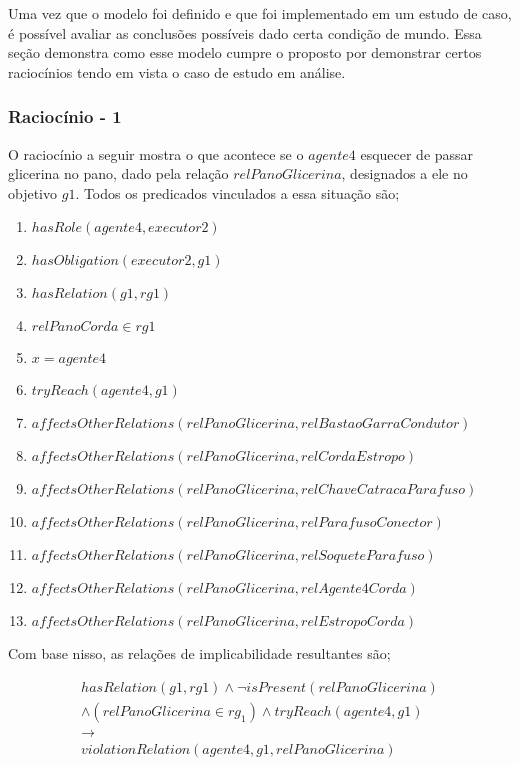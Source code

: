 \label{racs}

Uma vez que o modelo foi definido e que foi implementado em um estudo de caso, é possível avaliar as conclusões possíveis dado certa condição de mundo. Essa seção demonstra 
como esse modelo cumpre o proposto por demonstrar certos raciocínios tendo em vista o caso de estudo em análise. 

\subsubsection{Raciocínio - 1} 
\label{raciocinio1}

O raciocínio a seguir mostra o que acontece se o $agente4$ esquecer de passar glicerina no pano, dado pela relação $relPanoGlicerina$, designados a ele no objetivo $g1$. 
Todos os predicados vinculados a essa situação são;

\begin{enumerate}
	\item $hasRole(agente4,executor2)$ 
	\item $hasObligation(executor2,g1)$
	\item $hasRelation(g1,rg1)$ 
	\item $relPanoCorda \in rg1$
	\item $ x = agente4 $
	\item $tryReach(agente4,g1)$
	\item $affectsOtherRelations(relPanoGlicerina,relBastaoGarraCondutor)$
	\item $affectsOtherRelations(relPanoGlicerina,relCordaEstropo)$  
	\item $affectsOtherRelations(relPanoGlicerina,relChaveCatracaParafuso)$
	\item $affectsOtherRelations(relPanoGlicerina,relParafusoConector)$ 
	\item $affectsOtherRelations(relPanoGlicerina,relSoqueteParafuso)$ 
	\item $affectsOtherRelations(relPanoGlicerina,relAgente4Corda)$ 
	\item $affectsOtherRelations(relPanoGlicerina,relEstropoCorda)$	
\end{enumerate}

Com base nisso, as relações de implicabilidade resultantes são;

\begin{eqnarray}\nonumber
	hasRelation(g1,rg1)\wedge \neg isPresent(relPanoGlicerina)  \nonumber \\ 
	\wedge (relPanoGlicerina\in rg_1) \wedge tryReach(agente4,g1) \nonumber \\ 
	\to \nonumber \\ 
	violationRelation(agente4,g1,relPanoGlicerina) \nonumber \\	
\end{eqnarray}

